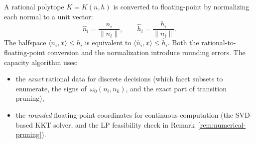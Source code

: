 \begin{remark}%
\label{rem:f64-conversion}
A rational polytope $K = K(n, h)$ is converted to
floating-point by normalizing each normal to a unit
vector:
\[
  \hat n_i = \frac{n_i}{\|n_i\|}, \qquad
  \hat h_i = \frac{h_i}{\|n_i\|}.
\]
The halfspace $\langle n_i, x \rangle \leq h_i$ is
equivalent to
$\langle \hat n_i, x \rangle \leq \hat h_i$.
Both the rational-to-floating-point conversion
and the normalization introduce rounding errors.
The capacity algorithm uses:
\begin{itemize}
\item the \emph{exact} rational data for discrete
  decisions (which facet subsets to enumerate,
  the signs of~$\omega_0(n_i, n_k)$,
  and the exact part of transition pruning),
\item the \emph{rounded} floating-point coordinates
  for continuous computation (the SVD-based
  KKT solver, and the LP feasibility check
  in Remark~\ref{rem:numerical-pruning}).
\end{itemize}
\end{remark}
